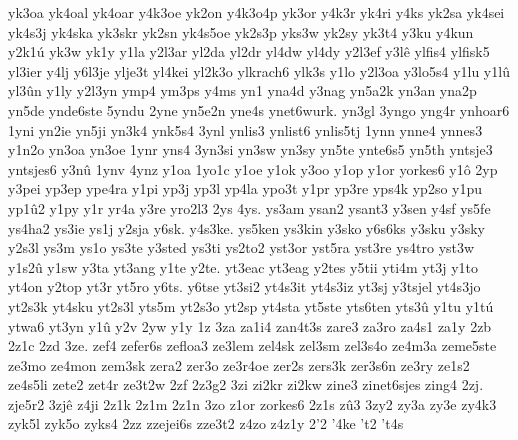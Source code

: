 {yk3oa
yk4oal
yk4oar
y4k3oe
yk2on
y4k3o4p
yk3or
y4k3r
yk4ri
y4ks
yk2sa
yk4sei
yk4s3j
yk4ska
yk3skr
yk2sn
yk4s5oe
yk2s3p
yks3w
yk2sy
yk3t4
y3ku
y4kun
y2k1ú
yk3w
yk1y
y1la
y2l3ar
yl2da
yl2dr
yl4dw
yl4dy
y2l3ef
y3lê
ylfis4
ylfisk5
yl3ier
y4lj
y6l3je
ylje3t
yl4kei
yl2k3o
ylkrach6
ylk3s
y1lo
y2l3oa
y3lo5s4
y1lu
y1lû
yl3ûn
y1ly
y2l3yn
ymp4
ym3ps
y4ms
yn1
yna4d
y3nag
yn5a2k
yn3an
yna2p
yn5de
ynde6ste
5yndu
2yne
yn5e2n
yne4s
ynet6wurk.
yn3gl
3yngo
yng4r
ynhoar6
1yni
yn2ie
yn5ji
yn3k4
ynk5s4
3ynl
ynlis3
ynlist6
ynlis5tj
1ynn
ynne4
ynnes3
y1n2o
yn3oa
yn3oe
1ynr
yns4
3yn3si
yn3sw
yn3sy
yn5te
ynte6s5
yn5th
yntsje3
yntsjes6
y3nû
1ynv
4ynz
y1oa
1yo1c
y1oe
y1ok
y3oo
y1op
y1or
yorkes6
y1ô
2yp
y3pei
yp3ep
ype4ra
y1pi
yp3j
yp3l
yp4la
ypo3t
y1pr
yp3re
yps4k
yp2so
y1pu
yp1û2
y1py
y1r
yr4a
y3re
yro2l3
2ys
4ys.
ys3am
ysan2
ysant3
y3sen
y4sf
ys5fe
ys4ha2
ys3ie
ys1j
y2sja
y6sk.
y4s3ke.
ys5ken
ys3kin
y3sko
y6s6ks
y3sku
y3sky
y2s3l
ys3m
ys1o
ys3te
y3sted
ys3ti
ys2to2
yst3or
yst5ra
yst3re
ys4tro
yst3w
y1s2û
y1sw
y3ta
yt3ang
y1te
y2te.
yt3eac
yt3eag
y2tes
y5tii
yti4m
yt3j
y1to
yt4on
y2top
yt3r
yt5ro
y6ts.
y6tse
yt3si2
yt4s3it
yt4s3iz
yt3sj
y3tsjel
yt4s3jo
yt2s3k
yt4sku
yt2s3l
yts5m
yt2s3o
yt2sp
yt4sta
yt5ste
yts6ten
yts3û
y1tu
y1tú
ytwa6
yt3yn
y1û
y2v
2yw
y1y
1z
3za
za1i4
zan4t3s
zare3
za3ro
za4s1
za1y
2zb
2z1c
2zd
3ze.
zef4
zefer6s
zefloa3
ze3lem
zel4sk
zel3sm
zel3s4o
ze4m3a
zeme5ste
ze3mo
ze4mon
zem3sk
zera2
zer3o
ze3r4oe
zer2s
zers3k
zer3s6n
ze3ry
ze1s2
ze4s5li
zete2
zet4r
ze3t2w
2zf
2z3g2
3zi
zi2kr
zi2kw
zine3
zinet6sjes
zing4
2zj.
zje5r2
3zjê
z4ji
2z1k
2z1m
2z1n
3zo
z1or
zorkes6
2z1s
zû3
3zy2
zy3a
zy3e
zy4k3
zyk5l
zyk5o
zyks4
2zz
zzejei6s
zze3t2
z4zo
z4z1y
2'2
'4ke
't2
't4s
}

